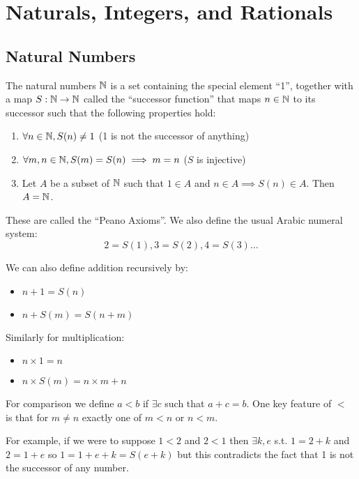 \documentclass[../main.tex]{subfiles}
\begin{document}
\chapter{Naturals, Integers, and Rationals}
\section{Natural Numbers}
\begin{definition}
  \label{naturalDef}
  The natural numbers $\mathbb{N}$ is a set containing the special element ``1'', together with a map $S: \mathbb{N} \to \mathbb{N}$ called the ``successor function'' that maps $n \in \mathbb{N}$ to its successor such that the following properties hold:
  \begin{enumerate}
    \item $\forall n \in \mathbb{N}, S(n) \neq 1$ (1 is not the successor of anything)
    \item $\forall m, n \in \mathbb{N}, S(m) = S(n) \implies m = n$ ($S$ is injective)
    \item Let $A$ be a subset of $\mathbb{N}$ such that $1 \in A$ and $n \in A \implies S(n) \in A$. Then $A = \mathbb{N}$.
  \end{enumerate}
\end{definition}
These are called the ``Peano Axioms''.
We also define the usual Arabic numeral system:
\[
  2 = S(1), 3 = S(2), 4 = S(3) \ldots
\]

We can also define addition recursively by:
\begin{itemize}
  \item $n + 1 = S(n)$
  \item $n + S(m) = S(n + m)$
\end{itemize}
Similarly for multiplication:
\begin{itemize}
  \item $n \times 1 = n$
  \item $n \times S(m) = n \times m + n$
\end{itemize}
For comparison we define $a < b$ if $\exists c$ such that $a + c = b$.
One key feature of $<$ is that for $m \neq n$ exactly one of $m < n$ or $n < m$.
\begin{example}
  For example, if we were to suppose $1 < 2$ and $2 < 1$ then  $\exists k, e$ s.t. $1 = 2 + k$ and $2 = 1 + e$ so $1 = 1 + e + k = S(e + k)$ but this contradicts the fact that 1 is not the successor of any number.
\end{example}
\end{document}

